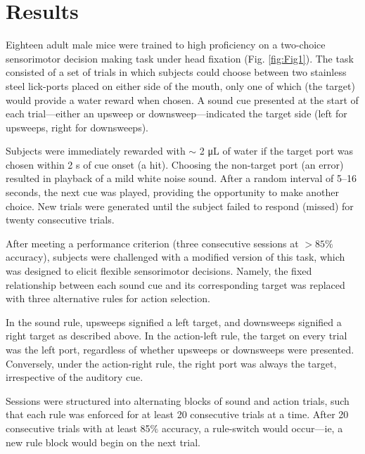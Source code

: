 \section{Results}

Eighteen adult male mice were trained to high proficiency on a two-choice sensorimotor decision making task under head fixation (Fig. \ref{fig:Fig1}). The task consisted of a set of trials in which subjects could choose between two stainless steel lick-ports placed on either side of the mouth, only one of which (the target) would provide a water reward when chosen. A sound cue presented at the start of each trial---either an upsweep or downsweep---indicated the target side (left for upsweeps, right for downsweeps).

Subjects were immediately rewarded with $\sim$ 2 \si{\uL} of water if the target port was chosen within 2 s of cue onset (a hit). Choosing the non-target port (an error) resulted in playback of a mild white noise sound. After a random interval of 5--16 seconds, the next cue was played, providing the opportunity to make another choice. New trials were generated until the subject failed to respond (missed) for twenty consecutive trials.

After meeting a performance criterion (three consecutive sessions at $>85\%$  accuracy), subjects were challenged with a modified version of this task, which was designed to elicit flexible sensorimotor decisions. Namely, the fixed relationship between each sound cue and its corresponding target was replaced with three alternative rules for action selection. 

In the sound rule, upsweeps signified a left target, and downsweeps signified a right target as described above. In the action-left rule, the target on every trial was the left port, regardless of whether upsweeps or downsweeps were presented. Conversely, under the action-right rule, the right port was always the target, irrespective of the auditory cue. 

Sessions were structured into alternating blocks of sound and action trials, such that each rule was enforced for at least 20 consecutive trials at a time. After 20 consecutive trials with at least 85$\%$  accuracy, a rule-switch would occur---ie, a new rule block would begin on the next trial.

